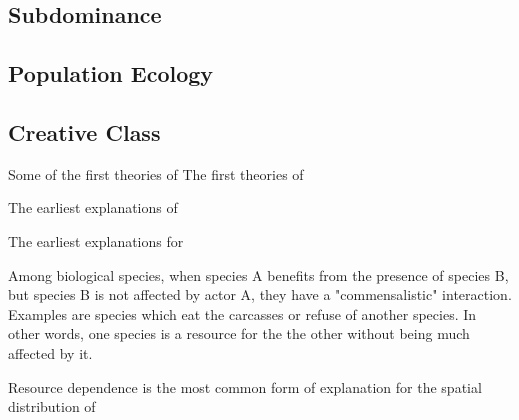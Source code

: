 \subsection*{Subdominance}

\subsection*{Population Ecology}

\subsection*{Creative Class}

Some of the first theories of The first theories of 

The earliest explanations of 

The earliest explanations for 


Among biological species, when species A benefits from the presence of
species B, but species B is not affected by actor A, they have a
"commensalistic" interaction. Examples are species which eat the
carcasses or refuse of another species. In other words, one species is
a resource for the the other without being much affected by it. 

Resource dependence is the most common form of explanation for the
spatial distribution of


